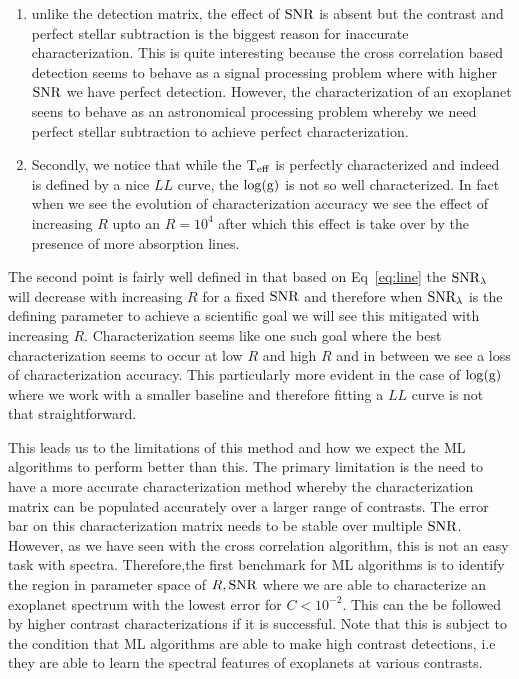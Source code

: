 \begin{enumerate}
    \item unlike the detection matrix, the effect of $\rm{SNR}$ is absent but the contrast and perfect stellar subtraction is the biggest reason for inaccurate characterization.
    This is quite interesting because the cross correlation based detection seems to behave as a signal processing problem where with higher $\rm{SNR}$ we have perfect detection.
    However, the characterization of an exoplanet seens to behave as an astronomical processing problem whereby we need perfect stellar subtraction to achieve perfect characterization.
    \item Secondly, we notice that while the $\rm{T_{eff}}$ is perfectly characterized and indeed is defined by a nice $LL$ curve, the $\log(\rm{g})$ is not so well characterized. 
    In fact when we see the evolution of characterization accuracy we see the effect of increasing $R$ upto an $R=10^{4}$ after which this effect is take over by the presence of more absorption lines.
\end{enumerate}
The second point is fairly well defined in that based on Eq~\ref{eq:line} the $\rm{SNR_{\lambda}}$ will decrease with increasing $R$ for a fixed $\rm{SNR}$ and therefore when $\rm{SNR_{\lambda}}$ is the defining parameter to achieve a scientific goal we will see this mitigated with increasing $R$.
Characterization seems like one such goal where the best characterization seems to occur at low $R$ and high $R$ and in between we see a loss of characterization accuracy.
This particularly more evident in the case of $\log(\rm{g})$ where we work with a smaller baseline and therefore fitting a $LL$ curve is not that straightforward.

This leads us to the limitations of this method and how we expect the ML algorithms to perform better than this.
The primary limitation is the need to have a more accurate characterization method whereby the characterization matrix can be populated accurately over a larger range of contrasts.
The error bar on this characterization matrix needs to be stable over multiple $\rm{SNR}$.
However, as we have seen with the cross correlation algorithm, this is not an easy task with spectra.
Therefore,the first benchmark for ML algorithms is to identify the region in parameter space of $R,\rm{SNR}$ where we are able to characterize an exoplanet spectrum with the lowest error for $C<10^{-2}$.
This can the be followed by higher contrast characterizations if it is successful.
Note that this is subject to the condition that ML algorithms are able to make high contrast detections, i.e they are able to learn the spectral features of exoplanets at various contrasts.

